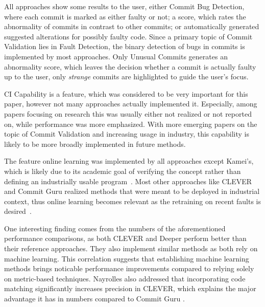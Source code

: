 All approaches show some results to the user, either Commit Bug Detection, where each commit is marked as either faulty or not; a score, which rates the abnormality of commits in contrast to other commits; or automatically generated suggested alterations for possibly faulty code. Since a primary topic of Commit Validation lies in Fault Detection, the binary detection of bugs in commits is implemented by most approaches. Only Unusual Commits \cite{Goyal2017} generates an abnormality score, which leaves the decision whether a commit is actually faulty up to the user, only \textit{strange} commits are highlighted to guide the user's focus.

CI Capability is a feature, which was considered to be very important for this paper, however not many approaches actually implemented it. Especially, among papers focusing on research this was usually either not realized or not reported on, while performance was more emphasized. With more emerging papers on the topic of Commit Validation and increasing usage in industry, this capability is likely to be more broadly implemented in future methods.

The feature online learning was implemented by all approaches except Kamei's, which is likely due to its academic goal of verifying the concept rather than defining an industrially usable program~\cite{Kamei2013}. 
Most other approaches like CLEVER and Commit Guru realized methods that were meant to be deployed in industrial context, thus online learning becomes relevant as the retraining on recent faults is desired~\cite{Nayrolles2018,Rosen2015}.


One interesting finding comes from the numbers of the aforementioned performance comparisons, as both CLEVER and Deeper perform better than their reference approaches. They also implement similar methods as both rely on machine learning. This correlation suggests that establishing machine learning methods brings noticable performance improvements compared to relying solely on metric-based techniques. Nayrolles also addressed that incorporating code matching significantly increases precision in CLEVER, which explains the major advantage it has in numbers compared to Commit Guru \cite{Nayrolles2018}.

